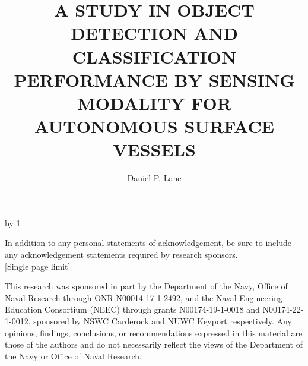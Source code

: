 \documentclass{erauthesis}
\title{A STUDY IN OBJECT DETECTION AND CLASSIFICATION
PERFORMANCE BY SENSING MODALITY FOR AUTONOMOUS
SURFACE VESSELS} %
\author{Daniel P. Lane}
\begin{document}
\frontmatter

\maketitle

\makeatletter 
\advance\fau@frontstage by 1  %


\begin{acknowledgements}

    \raggedright In addition to any personal statements of acknowledgement, be sure to include any acknowledgement statements required by research sponsors.\\{[Single page limit]} 

    \raggedright This research was sponsored in part by the Department of the Navy, Office of Naval Research through ONR N00014-17-1-2492, and the Naval Engineering Education Consortium (NEEC) through grants N00174-19-1-0018 and N00174-22-1-0012, sponsored by NSWC Carderock and NUWC Keyport respectively. Any opinions, findings, conclusions, or recommendations expressed in this material are those of the authors and do not necessarily reflect the views of the Department of the Navy or Office of Naval Research.
\end{acknowledgements}
\end{document}
